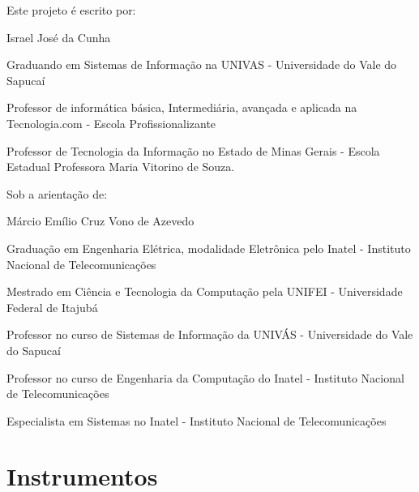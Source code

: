 
\par Este projeto é escrito por:
\par Israel José da Cunha
\par Graduando em Sistemas de Informação na UNIVAS - Universidade do Vale do
Sapucaí 
\par Professor de informática básica, Intermediária, avançada e aplicada na
Tecnologia.com - Escola Profissionalizante
\par Professor de Tecnologia da Informação no Estado de Minas Gerais - Escola
Estadual Professora Maria Vitorino de Souza.



\par Sob a arientação de:
\par Márcio Emílio Cruz Vono de Azevedo
\par Graduação em Engenharia Elétrica, modalidade Eletrônica pelo Inatel -
Instituto Nacional de Telecomunicações
\par Mestrado em Ciência e Tecnologia da Computação pela UNIFEI - Universidade
Federal de Itajubá
\par Professor no curso de Sistemas de Informação da UNIVÁS - Universidade do
Vale do Sapucaí
\par Professor no curso de Engenharia da Computação do Inatel - Instituto
Nacional de Telecomunicações
\par Especialista em Sistemas no Inatel - Instituto Nacional de Telecomunicações




\section{Instrumentos}





